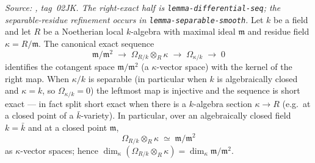 \begin{lemma}
  \label{lem:cotangent_kahler_over_field}
  \textit{Source: \cite{stacks-project}, tag~02JK. The right-exact half is
  \texttt{lemma-differential-seq}; the separable-residue refinement occurs in
  \texttt{lemma-separable-smooth}.}
  Let \(k\) be a field and let \(R\) be a Noetherian local
  \(k\)-algebra with maximal ideal \(\mathfrak m\) and residue field
  \(\kappa = R/\mathfrak m\). The canonical exact sequence
  \[
    \mathfrak m / \mathfrak m^2
    \;\longrightarrow\; \Omega_{R/k} \otimes_R \kappa
    \;\longrightarrow\; \Omega_{\kappa / k}
    \;\longrightarrow\; 0
  \]
  identifies the cotangent space \(\mathfrak m / \mathfrak m^2\) (a
  \(\kappa\)-vector space) with the kernel of the right map. When
  \(\kappa / k\) is separable (in particular when \(k\) is
  algebraically closed and \(\kappa = k\), so \(\Omega_{\kappa / k}
  = 0\)) the leftmost map is injective and the sequence is short exact
  --- in fact split short exact when there is a \(k\)-algebra section
  \(\kappa \to R\) (e.g.\ at a closed point of a \(\bar k\)-variety).
  In particular, over an algebraically closed field \(k = \bar k\) and
  at a closed point \(\mathfrak m\),
  \[
    \Omega_{R/k} \otimes_R \kappa \;\simeq\; \mathfrak m / \mathfrak m^2
  \]
  as \(\kappa\)-vector spaces; hence
  \(\dim_\kappa(\Omega_{R/k} \otimes_R \kappa)
   = \dim_\kappa \mathfrak m / \mathfrak m^2\).
\end{lemma}

